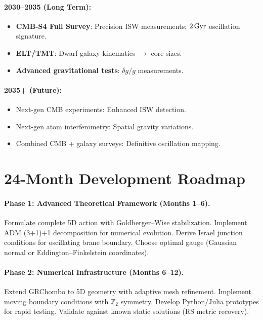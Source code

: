 \paragraph{2030--2035 (Long Term):}
\begin{itemize}
  \item \textbf{CMB-S4 Full Survey}: Precision ISW measurements; $2\,\text{Gyr}$ oscillation signature.
  \item \textbf{ELT/TMT}: Dwarf galaxy kinematics $\to$ core sizes.
  \item \textbf{Advanced gravitational tests}: $\delta g/g$ measurements.
\end{itemize}

\paragraph{2035+ (Future):}
\begin{itemize}
  \item Next-gen CMB experiments: Enhanced ISW detection.
  \item Next-gen atom interferometry: Spatial gravity variations.
  \item Combined CMB + galaxy surveys: Definitive oscillation mapping.
\end{itemize}

\section{24-Month Development Roadmap}
\label{sec:roadmap}

\paragraph{Phase 1: Advanced Theoretical Framework (Months 1--6).}
Formulate complete 5D action with Goldberger--Wise stabilization. Implement ADM (3+1)+1 decomposition for numerical evolution. Derive Israel junction conditions for oscillating brane boundary. Choose optimal gauge (Gaussian normal or Eddington--Finkelstein coordinates).

\paragraph{Phase 2: Numerical Infrastructure (Months 6--12).}
Extend GRChombo to 5D geometry with adaptive mesh refinement. Implement moving boundary conditions with $\mathbb{Z}_2$ symmetry. Develop Python/Julia prototypes for rapid testing. Validate against known static solutions (RS metric recovery).

